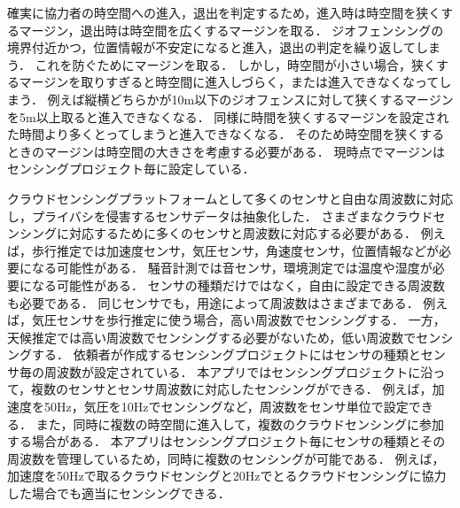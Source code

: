 確実に協力者の時空間への進入，退出を判定するため，進入時は時空間を狭くするマージン，退出時は時空間を広くするマージンを取る．
ジオフェンシングの境界付近かつ，位置情報が不安定になると進入，退出の判定を繰り返してしまう．
これを防ぐためにマージンを取る．
しかし，時空間が小さい場合，狭くするマージンを取りすぎると時空間に進入しづらく，または進入できなくなってしまう．
例えば縦横どちらかが10m以下のジオフェンスに対して狭くするマージンを5m以上取ると進入できなくなる．
同様に時間を狭くするマージンを設定された時間より多くとってしまうと進入できなくなる．
そのため時空間を狭くするときのマージンは時空間の大きさを考慮する必要がある．
現時点でマージンはセンシングプロジェクト毎に設定している．

クラウドセンシングプラットフォームとして多くのセンサと自由な周波数に対応し，プライバシを侵害するセンサデータは抽象化した．
さまざまなクラウドセンシングに対応するために多くのセンサと周波数に対応する必要がある．
例えば，歩行推定では加速度センサ，気圧センサ，角速度センサ，位置情報などが必要になる可能性がある．
騒音計測では音センサ，環境測定では温度や湿度が必要になる可能性がある．
センサの種類だけではなく，自由に設定できる周波数も必要である．
同じセンサでも，用途によって周波数はさまざまである．
例えば，気圧センサを歩行推定に使う場合，高い周波数でセンシングする．
一方，天候推定では高い周波数でセンシングする必要がないため，低い周波数でセンシングする．
依頼者が作成するセンシングプロジェクトにはセンサの種類とセンサ毎の周波数が設定されている．
本アプリではセンシングプロジェクトに沿って，複数のセンサとセンサ周波数に対応したセンシングができる．
例えば，加速度を50Hz，気圧を10Hzでセンシングなど，周波数をセンサ単位で設定できる．
また，同時に複数の時空間に進入して，複数のクラウドセンシングに参加する場合がある．
本アプリはセンシングプロジェクト毎にセンサの種類とその周波数を管理しているため，同時に複数のセンシングが可能である．
例えば，加速度を50Hzで取るクラウドセンシグと20Hzでとるクラウドセンシングに協力した場合でも適当にセンシングできる．




